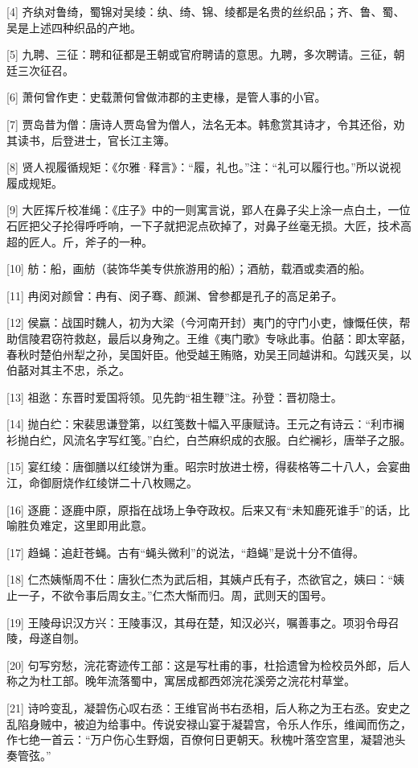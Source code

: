 \documentclass[12pt,UTF8]{ctexbook}
\begin{document}
[4] 齐纨对鲁绮，蜀锦对吴绫：纨、绮、锦、绫都是名贵的丝织品；齐、鲁、蜀、吴是上述四种织品的产地。

[5] 九聘、三征：聘和征都是王朝或官府聘请的意思。九聘，多次聘请。三征，朝廷三次征召。

[6] 萧何曾作吏：史载萧何曾做沛郡的主吏椽，是管人事的小官。

[7] 贾岛昔为僧：唐诗人贾岛曾为僧人，法名无本。韩愈赏其诗才，令其还俗，劝其读书，后登进士，官长江主簿。

[8] 贤人视履循规矩：《尔雅·释言》：“履，礼也。”注：“礼可以履行也。”所以说视履成规矩。

[9] 大匠挥斤校准绳：《庄子》中的一则寓言说，郢人在鼻子尖上涂一点白土，一位石匠把父子抡得呼呼响，一下子就把泥点砍掉了，对鼻子丝毫无损。大匠，技术高超的匠人。斤，斧子的一种。

[10] 舫：船，画舫（装饰华美专供旅游用的船）；酒舫，载酒或卖酒的船。

[11] 冉闵对颜曾：冉有、闵子骞、颜渊、曾参都是孔子的高足弟子。

[12] 侯嬴：战国时魏人，初为大梁（今河南开封）夷门的守门小吏，慷慨任侠，帮助信陵君窃符救赵，最后以身殉之。王维《夷门歌》专咏此事。伯嚭：即太宰嚭，春秋时楚伯州犁之孙，吴国奸臣。他受越王贿赂，劝吴王同越讲和。勾践灭吴，以伯嚭对其主不忠，杀之。

[13] 祖逖：东晋时爱国将领。见先韵“祖生鞭”注。孙登：晋初隐士。

[14] 抛白纻：宋裴思谦登第，以红笺数十幅入平康赋诗。王元之有诗云：“利市襕衫抛白纻，风流名字写红笺。”白纻，白苎麻织成的衣服。白纻襕衫，唐举子之服。

[15] 宴红绫：唐御膳以红绫饼为重。昭宗时放进士榜，得裴格等二十八人，会宴曲江，命御厨烧作红绫饼二十八枚赐之。

[16] 逐鹿：逐鹿中原，原指在战场上争夺政权。后来又有“未知鹿死谁手”的话，比喻胜负难定，这里即用此意。

[17] 趋蝇：追赶苍蝇。古有“蝇头微利”的说法，“趋蝇”是说十分不值得。

[18] 仁杰姨惭周不仕：唐狄仁杰为武后相，其姨卢氏有子，杰欲官之，姨曰：“姨止一子，不欲令事后周女主。”仁杰大惭而归。周，武则天的国号。

[19] 王陵母识汉方兴：王陵事汉，其母在楚，知汉必兴，嘱善事之。项羽令母召陵，母遂自刎。

[20] 句写穷愁，浣花寄迹传工部：这是写杜甫的事，杜拾遗曾为检校员外郎，后人称之为杜工部。晚年流落蜀中，寓居成都西郊浣花溪旁之浣花村草堂。

[21] 诗吟变乱，凝碧伤心叹右丞：王维官尚书右丞相，后人称之为王右丞。安史之乱陷身贼中，被迫为给事中。传说安禄山宴于凝碧宫，令乐人作乐，维闻而伤之，作七绝一首云：“万户伤心生野烟，百僚何日更朝天。秋槐叶落空宫里，凝碧池头奏管弦。”
\end{document}
